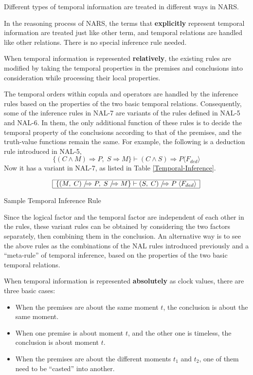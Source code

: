 Different types of temporal information are treated in different ways in NARS.

In the reasoning process of NARS, the terms that \textbf{explicitly} represent temporal information are treated just like other term, and temporal relations are handled like other relations. There is no special inference rule needed.

When temporal information is represented \textbf{relatively}, the existing rules are modified by taking the temporal properties in the premises and conclusions into consideration while processing their local properties.

The temporal orders within copula and operators are handled by the inference rules based on the properties of the two basic temporal relations. Consequently, some of the inference rules in NAL-7 are variants of the rules defined in NAL-5 and NAL-6. In them, the only additional function of these rules is to decide the temporal property of the conclusions according to that of the premises, and the truth-value functions remain the same. For example, the following is a deduction rule introduced in NAL-5,
\[\{(C \wedge M) \Rightarrow P , \; S \Rightarrow M \} \vdash (C \wedge S) \Rightarrow P \langle F_{ded}\rangle\]
Now it has a variant in NAL-7, as listed in Table \ref{Temporal-Inference}.
\begin{table}[htb]
\[\begin{array}{|c|}
\hline
\{(M, \; C) \;/\!\!\!\Rightarrow P , \; S \;/\!\!\!\Rightarrow M \}  \vdash (S, \; C) \;/\!\!\!\Rightarrow P \; \langle F_{ded}\rangle \\
\hline
\end{array}\]
\caption{Sample Temporal Inference Rule}
\label{Temporal-Inference}
\end{table}
Since the logical factor and the temporal factor are independent of each other in the rules, these variant rules can be obtained by considering the two factors separately, then combining them in the conclusion. An alternative way is to see the above rules as the combinations of the NAL rules introduced previously and a ``meta-rule'' of temporal inference, based on the properties of the two basic temporal relations.

When temporal information is represented \textbf{absolutely} as clock values, there are three basic cases:
\begin{itemize}
	\item When the premises are about the same moment $t$, the conclusion is about the same moment.
	\item When one premise is about moment $t$, and the other one is timeless, the conclusion is about moment $t$.
	\item When the premises are about the different moments $t_1$ and $t_2$, one of them need to be ``casted'' into another.
\end{itemize}

